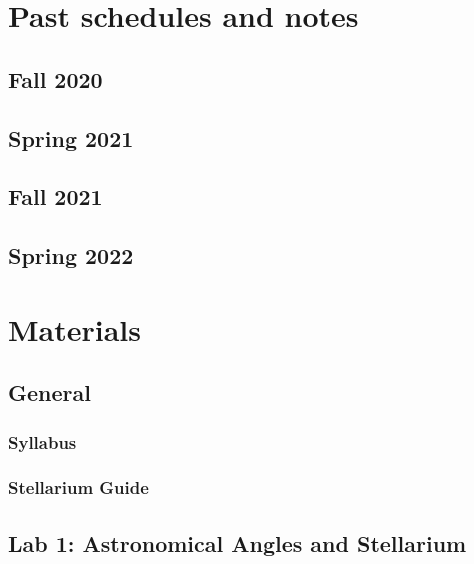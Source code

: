 \documentclass[12pt]{article}
\begin{document}
\newpage




\section{Past schedules and notes}


\subsection{Fall 2020}


\subsection{Spring 2021}


\subsection{Fall 2021}


\subsection{Spring 2022}


\newpage
\section{Materials}


\subsection{General}


\subsubsection{Syllabus}


\subsubsection{Stellarium Guide}
%

\subsection{Lab 1: Astronomical Angles and Stellarium}
\end{document}
